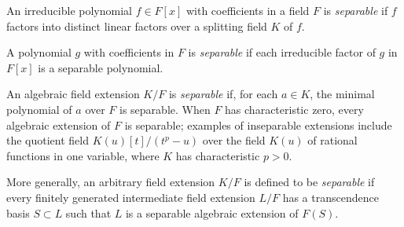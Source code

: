 \documentclass{article}
\begin{document}
An irreducible polynomial $f \in F[x]$ with coefficients in a field $F$ is {\em separable} if $f$ factors into distinct linear factors over a splitting field $K$ of $f$.

A polynomial $g$ with coefficients in $F$ is {\em separable} if each irreducible factor of $g$ in $F[x]$ is a separable polynomial.

An algebraic field extension $K/F$ is {\em separable} if, for each $a \in K$, the minimal polynomial of $a$ over $F$ is separable. When $F$ has characteristic zero, every algebraic extension of $F$ is separable; examples of inseparable extensions include the quotient field $K(u)[t]/(t^p-u)$ over the field $K(u)$ of rational functions in one variable, where $K$ has characteristic $p > 0$.

More generally, an arbitrary field extension $K/F$ is defined to be {\em separable} if every finitely generated intermediate field extension $L/F$ has a transcendence basis $S \subset L$ such that $L$ is a separable algebraic extension of $F(S)$.
\end{document}
